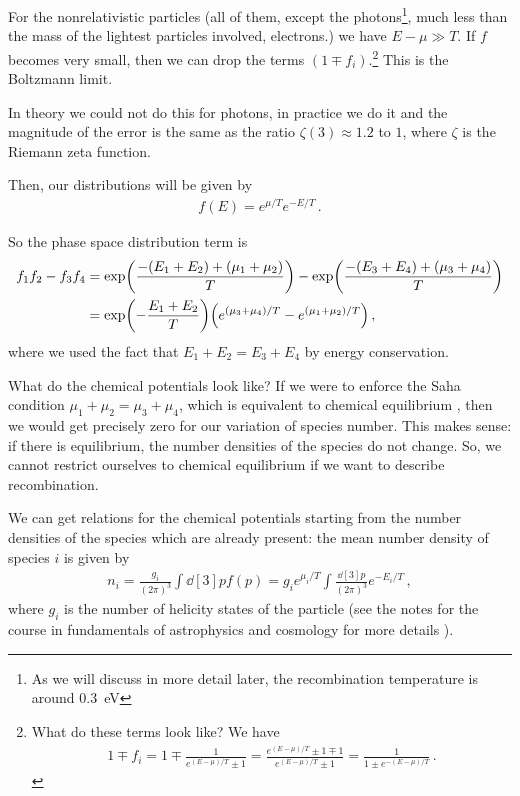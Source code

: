 \documentclass[main.tex]{subfiles}
\begin{document}
For the nonrelativistic particles (all of them, except the photons\footnote{As we will discuss in more detail later, the recombination temperature is around \SI{.3}{eV}}, much less than the mass of the lightest particles involved, electrons.) we have \(E - \mu \gg T\). 
If \(f\) becomes very small, then we can drop the terms \((1 \mp f_i)\).\footnote{What do these terms look like? We have 
%
\begin{align}
1 \mp f_i = 1 \mp \frac{1}{e^{(E-\mu ) / T} \pm 1}
= \frac{e^{(E - \mu ) / T} \pm 1 \mp 1}{e^{(E- \mu ) / T} \pm 1 }
= \frac{1}{1 \pm e^{- (E - \mu ) / T}}
\,.
\end{align}
%
} This is the Boltzmann limit. 

In theory we could not do this for photons, in practice we do it and the magnitude of the error is the same as the ratio \(\zeta (3) \approx 1.2\) to \(1\), where \(\zeta \) is the Riemann zeta function. 

Then, our distributions will be given by 
%
\begin{align}
f(E) = e^{ \mu / T} e^{- E/ T}
\,.
\end{align}

So the phase space distribution term is 
%
\begin{align}
f_1 f_2 - f_3 f_4 &= \exp(\frac{-(E_1 + E_2 ) + (\mu_1 +\mu_2 )}{T})
- \exp(\frac{-(E_3 + E_4) + (\mu_3 +\mu_4 )}{T})\\
&=\exp(- \frac{E_1 + E_2 }{T} ) \qty(e^{(\mu_3 + \mu_4 ) / T} - e^{(\mu_1 + \mu_2 ) / T})
\,,
\end{align}
%
where we used the fact that \(E_1 + E_2 = E_3 + E_4 \) by energy conservation. 

What do the chemical potentials look like?
If we were to enforce the Saha condition \(\mu_1 + \mu_2 = \mu_3 + \mu_4 \), which is equivalent to chemical equilibrium , then we would get precisely zero for our variation of species number.
This makes sense: if there is equilibrium, the number densities of the species do not change.
So, we cannot restrict ourselves to chemical equilibrium if we want to describe recombination. 

We can get relations for the chemical potentials starting from the number densities of the species which are already present:
the mean number density of species \(i\) is given by 
%
\begin{align}
n_i = \frac{g_i}{(2\pi)^3} \int \dd[3]{p} f(p)
= g_i e^{\mu_{i} / T} \int \frac{ \dd[3]{p} }{(2 \pi )^3} e^{-E_i / T}
\,,
\end{align}
%
where \(g_i\) is the number of helicity states of the particle (see the notes for the course in fundamentals of astrophysics and cosmology for more details \cite[]{tissinoFundamentalsAstrophysicsCosmology2020}). 
\end{document}
